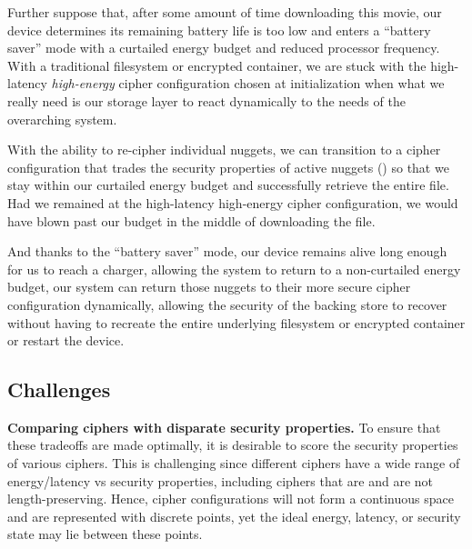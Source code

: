 Further suppose that, after some amount of time downloading this movie, our
device determines its remaining battery life is too low and enters a ``battery
saver'' mode with a curtailed energy budget and reduced processor frequency.
With a traditional filesystem or encrypted container, we are stuck with the
high-latency \emph{high-energy} cipher configuration chosen at initialization
when what we really need is our storage layer to react dynamically to the needs
of the overarching system.

With the ability to re-cipher individual nuggets, we can transition to a cipher
configuration that trades the security properties of active nuggets () so that we stay within our curtailed energy budget and successfully
retrieve the entire file. Had we remained at the high-latency high-energy cipher
configuration, we would have blown past our budget in the middle of downloading
the file.

And thanks to the ``battery saver'' mode, our device remains alive long enough
for us to reach a charger, allowing the system to return to a non-curtailed
energy budget, our system can return those nuggets to their more secure cipher
configuration dynamically, allowing the security of the backing store to recover
without having to recreate the entire underlying filesystem or encrypted
container or restart the device.

\subsection{Challenges}

\textbf{Comparing ciphers with disparate security properties.} To ensure that
these tradeoffs are made optimally, it is desirable to score the security
properties of various ciphers. This is challenging since different ciphers have
a wide range of energy/latency vs security properties, including ciphers that
are and are not length-preserving. Hence, cipher configurations will not form a
continuous space and are represented with discrete points, yet the ideal energy,
latency, or security state may lie between these points.

